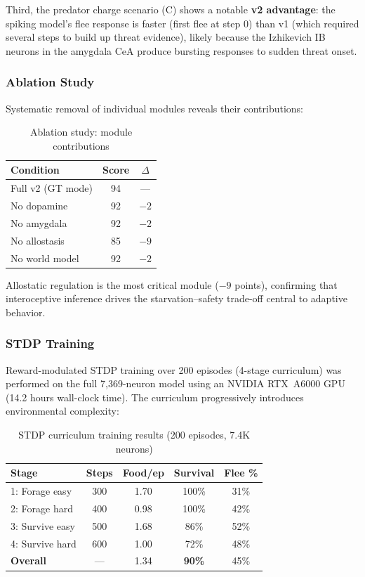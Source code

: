 \documentclass[9pt]{elife}
\begin{document}
Third, the predator charge scenario (C) shows a notable \textbf{v2 advantage}:
the spiking model's flee response is faster (first flee at step 0) than v1
(which required several steps to build up threat evidence), likely because
the Izhikevich IB neurons in the amygdala CeA produce bursting responses
to sudden threat onset.

\subsubsection{Ablation Study}

Systematic removal of individual modules reveals their contributions:

\begin{table}[h!]
\centering
\caption{Ablation study: module contributions}
\begin{tabular}{l c c}
\hline
\textbf{Condition} & \textbf{Score} & \textbf{$\Delta$} \\
\hline
Full v2 (GT mode)  & 94 & --- \\
No dopamine        & 92 & $-2$ \\
No amygdala        & 92 & $-2$ \\
No allostasis      & 85 & $-9$ \\
No world model     & 92 & $-2$ \\
\hline
\end{tabular}
\end{table}

Allostatic regulation is the most critical module ($-9$ points),
confirming that interoceptive inference drives the starvation--safety trade-off
central to adaptive behavior.

\subsubsection{STDP Training}

Reward-modulated STDP training over 200 episodes (4-stage curriculum)
was performed on the full 7,369-neuron model using an NVIDIA RTX~A6000 GPU
(14.2 hours wall-clock time). The curriculum progressively introduces
environmental complexity:

\begin{table}[h!]
\centering
\caption{STDP curriculum training results (200 episodes, 7.4K neurons)}
\begin{tabular}{l c c c c}
\hline
\textbf{Stage} & \textbf{Steps} & \textbf{Food/ep} & \textbf{Survival} & \textbf{Flee \%} \\
\hline
1: Forage easy  & 300 & 1.70 & 100\% & 31\% \\
2: Forage hard  & 400 & 0.98 & 100\% & 42\% \\
3: Survive easy & 500 & 1.68 & 86\%  & 52\% \\
4: Survive hard & 600 & 1.00 & 72\%  & 48\% \\
\hline
\textbf{Overall} & --- & 1.34 & \textbf{90\%} & 45\% \\
\hline
\end{tabular}
\end{table}
\end{document}
